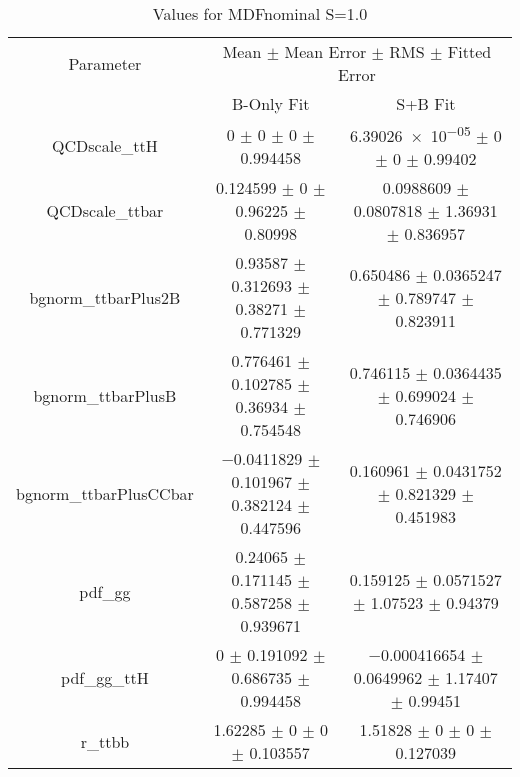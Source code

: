 \begin{table}
\centering
\caption{Values for MDFnominal S=1.0}
\begin{tabular}{ccc}
\toprule
Parameter & \multicolumn{2}{c}{Mean $\pm$ Mean Error $\pm$ RMS $\pm$ Fitted Error}\\
 & B-Only Fit & S+B Fit\\
\midrule
QCDscale\_ttH & \num{0} $\pm$ \num{0} $\pm$ \num{0} $\pm$ \num{0.994458} & \num{6.39026e-05} $\pm$ \num{0} $\pm$ \num{0} $\pm$ \num{0.99402}\\
QCDscale\_ttbar & \num{0.124599} $\pm$ \num{0} $\pm$ \num{0.96225} $\pm$ \num{0.80998} & \num{0.0988609} $\pm$ \num{0.0807818} $\pm$ \num{1.36931} $\pm$ \num{0.836957}\\
bgnorm\_ttbarPlus2B & \num{0.93587} $\pm$ \num{0.312693} $\pm$ \num{0.38271} $\pm$ \num{0.771329} & \num{0.650486} $\pm$ \num{0.0365247} $\pm$ \num{0.789747} $\pm$ \num{0.823911}\\
bgnorm\_ttbarPlusB & \num{0.776461} $\pm$ \num{0.102785} $\pm$ \num{0.36934} $\pm$ \num{0.754548} & \num{0.746115} $\pm$ \num{0.0364435} $\pm$ \num{0.699024} $\pm$ \num{0.746906}\\
bgnorm\_ttbarPlusCCbar & \num{-0.0411829} $\pm$ \num{0.101967} $\pm$ \num{0.382124} $\pm$ \num{0.447596} & \num{0.160961} $\pm$ \num{0.0431752} $\pm$ \num{0.821329} $\pm$ \num{0.451983}\\
pdf\_gg & \num{0.24065} $\pm$ \num{0.171145} $\pm$ \num{0.587258} $\pm$ \num{0.939671} & \num{0.159125} $\pm$ \num{0.0571527} $\pm$ \num{1.07523} $\pm$ \num{0.94379}\\
pdf\_gg\_ttH & \num{0} $\pm$ \num{0.191092} $\pm$ \num{0.686735} $\pm$ \num{0.994458} & \num{-0.000416654} $\pm$ \num{0.0649962} $\pm$ \num{1.17407} $\pm$ \num{0.99451}\\
r\_ttbb & \num{1.62285} $\pm$ \num{0} $\pm$ \num{0} $\pm$ \num{0.103557} & \num{1.51828} $\pm$ \num{0} $\pm$ \num{0} $\pm$ \num{0.127039}\\
\bottomrule
\end{tabular}
\end{table}